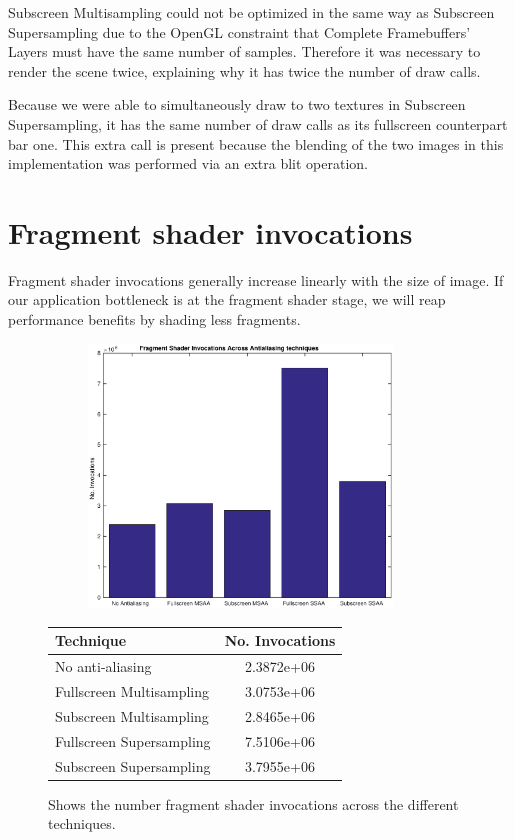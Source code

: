 \documentclass[12pt,a4paper,twoside,openright]{report}
\begin{document}
Subscreen Multisampling could not be optimized in the same way as Subscreen Supersampling due to the OpenGL constraint that Complete Framebuffers' Layers must have the same number of samples. Therefore it was necessary to render the scene twice, explaining why it has twice the number of draw calls.

Because we were able to simultaneously draw to two textures in Subscreen Supersampling, it has the same number of draw calls as its fullscreen counterpart bar one. This extra call is present because the blending of the two images in this implementation was performed via an extra blit operation.

\section{Fragment shader invocations}

Fragment shader invocations generally increase linearly with the size of image. If our application bottleneck is at the fragment shader stage, we will reap performance benefits by shading less fragments.

\begin{figure}[tbh]

 
\begin{subfigure}{0.5\textwidth}
\includegraphics[height=7cm]{figs/fsInvocations.eps}
\end{subfigure}
\qquad
\begin{tabular}{l|c}
Technique   & No. Invocations \\ 
\hline
No anti-aliasing      & 2.3872e+06 \\
Fullscreen Multisampling     & 3.0753e+06 \\
Subscreen Multisampling    &  2.8465e+06  \\
Fullscreen Supersampling      &  7.5106e+06   \\
Subscreen Supersampling    &  3.7955e+06  \\
\end{tabular}
 
\caption{Shows the number fragment shader invocations across the different techniques.}
\end{figure}
\end{document}

